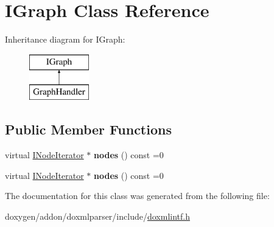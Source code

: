 \hypertarget{class_i_graph}{}\section{I\+Graph Class Reference}
\label{class_i_graph}
Inheritance diagram for I\+Graph\+:\begin{figure}[H]
\begin{center}
\leavevmode
\includegraphics[height=2.000000cm]{class_i_graph}
\end{center}
\end{figure}
\subsection*{Public Member Functions}
\begin{DoxyCompactItemize}
\item 
\mbox{\label{class_i_graph_ad4b44dfe37fda597439656729c1df57f}} 
virtual \mbox{\hyperlink{class_i_node_iterator}{I\+Node\+Iterator}} $\ast$ {\bfseries nodes} () const =0
\item 
\mbox{\label{class_i_graph_ad4b44dfe37fda597439656729c1df57f}} 
virtual \mbox{\hyperlink{class_i_node_iterator}{I\+Node\+Iterator}} $\ast$ {\bfseries nodes} () const =0
\end{DoxyCompactItemize}


The documentation for this class was generated from the following file\+:\begin{DoxyCompactItemize}
\item 
doxygen/addon/doxmlparser/include/\mbox{\hyperlink{include_2doxmlintf_8h}{doxmlintf.\+h}}\end{DoxyCompactItemize}
